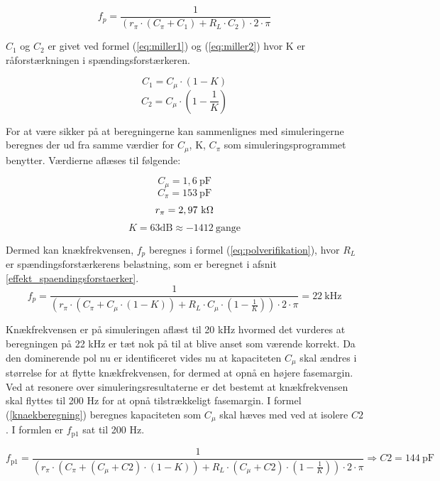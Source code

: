 \begin{equation}
f_p=\frac{1}{(r_\pi \cdot (C_\pi + C_1) + R_L \cdot C_2) \cdot 2 \cdot \pi}
\label{eq:knaekberegning_openloop}
\end{equation}

$C_1$ og $C_2$ er givet ved formel (\ref{eq:miller1}) og (\ref{eq:miller2}) hvor K er råforstærkningen i spændingsforstærkeren.

\begin{equation}
C_1=C_\mu \cdot \left( 1-K \right)
\label{eq:miller1}
\end{equation}
\begin{equation}
C_2=C_\mu \cdot \left( 1-\frac{1}{K} \right)
\label{eq:miller2}
\end{equation}

For at være sikker på at beregningerne kan sammenlignes med simuleringerne beregnes der ud fra samme værdier for $C_\mu$, K, $C_\pi$ som simuleringsprogrammet benytter. Værdierne aflæses til følgende: 

\[ C_\mu=1,6~\mathrm{pF} \]
\[ C_\pi=153~\mathrm{pF} \]
\[ r_\pi=2,97~\mathrm{k}\ohm \]
\[ K=63 \mathrm{dB} \approx -1412~\mathrm{gange}\]

Dermed kan knækfrekvensen, $f_p$ beregnes i formel (\ref{eq:polverifikation}), hvor $R_L$ er spændingsforstærkerens belastning, som er beregnet i afsnit \ref{effekt_spaendingsforstaerker}.
\begin{equation}
f_p=\frac{1}{(r_\pi \cdot (C_\pi + C_\mu \cdot \left( 1-K \right)) + R_L \cdot C_\mu \cdot \left( 1-\frac{1}{K} \right)) \cdot 2 \cdot \pi}=22~\mathrm{kHz}
\label{eq:polverifikation}
\end{equation}

Knækfrekvensen er på simuleringen aflæst til 20 kHz hvormed det vurderes at beregningen på 22 kHz er tæt nok på til at blive anset som værende korrekt. 
Da den dominerende pol nu er identificeret vides nu at kapaciteten $C_\mu$ skal ændres i størrelse for at flytte knækfrekvensen, for dermed at opnå en højere fasemargin. Ved at resonere over simuleringsresultaterne er det bestemt at knækfrekvensen skal flyttes til 200 Hz for at opnå tilstrækkeligt fasemargin. I formel (\ref{knaekberegning}) beregnes kapaciteten som $C_\mu$ skal hæves med ved at isolere $C2$. I formlen er $f_\mathrm{p1}$ sat til 200 Hz. 

\begin{equation}
f_\mathrm{p1}=\frac{1}{(r_\pi \cdot (C_\pi + (C_\mu + C2) \cdot \left( 1-K \right)) + R_L \cdot (C_\mu + C2) \cdot \left( 1-\frac{1}{K} \right)) \cdot 2 \cdot \pi} \Rightarrow C2=144~\mathrm{pF}
\label{knaekberegning}
\end{equation}


